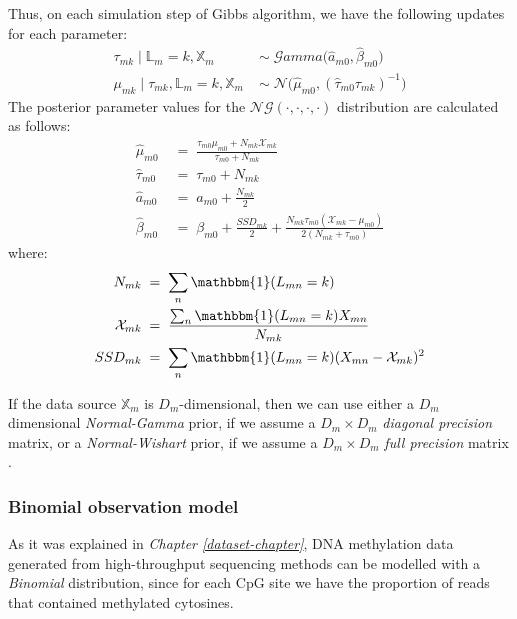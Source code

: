 Thus, on each simulation step of Gibbs algorithm, we have the following updates for each parameter:
\begin{equation}
  \begin{aligned}
  	\tau_{mk} \mid \mathbb{L}_{m}=k, \mathbb{X}_{m} \;& \sim \;\mathcal{G}amma\big(\hat{\mathit{a}}_{m0}, \hat{\beta}_{m0}\big) \\
	\mu_{mk} \mid \tau_{mk}, \mathbb{L}_{m}=k, \mathbb{X}_{m} \; & \sim \; \mathcal{N}\big(\hat{\mu}_{m0}, (\hat{\tau}_{m0} \tau_{mk})^{-1}\big)
  \end{aligned}
\end{equation}
The posterior parameter values for the $\mathcal{NG}(\cdot,\cdot,\cdot,\cdot)$ distribution are calculated as follows:
\begin{equation}
  \begin{aligned}
  	\hat{\mu}_{m0} \; &= \; \frac{\tau_{m0}\mu_{m0} + N_{mk}\mathcal{X}_{mk}}{\tau_{m0} + N_{mk}}\\
  	\hat{\tau}_{m0} \; &= \; \tau_{m0} + N_{mk}\\
  	\hat{\mathit{a}}_{m0} \; &= \; \mathit{a}_{m0} + \frac{N_{mk}}{2}\\
  	\hat{\beta}_{m0} \; &= \; \beta_{m0} + \frac{SSD_{mk}}{2} + \frac{N_{mk}\tau_{m0}(\mathcal{X}_{mk} - \mu_{m0})}{2(N_{mk}+\tau_{m0})}
  \end{aligned}
\end{equation}
where: 
\begin{equation}
  \begin{aligned}
		N_{mk} \; &= \; \sum_{n}\mathbbm{1}(L_{mn}=k)\\ 
		\mathcal{X}_{mk} \; &= \; \frac{\sum_{n}\mathbbm{1}(L_{mn}=k)X_{mn}}{N_{mk}} \\
		SSD_{mk} \; &= \; \sum_{n}\mathbbm{1}(L_{mn}=k)(X_{mn}-\mathcal{X}_{mk})^{2}
  \end{aligned}
\end{equation} 

If the data source $\mathbb{X}_{m}$ is $D_{m}$-dimensional, then we can use either a $D_{m}$ dimensional \emph{Normal-Gamma} prior, if we assume a $D_{m} \times D_{m}$ \emph{diagonal precision} matrix, or a \emph{Normal-Wishart} prior, if we assume a $D_{m} \times D_{m}$ \emph{full precision} matrix \cite[Ch. 2]{Bishop2006}.

\subsubsection*{Binomial observation model}
As it was explained in \emph{Chapter \ref{dataset-chapter}}, DNA methylation data generated from high-throughput sequencing methods can be modelled with a \emph{Binomial} distribution, since for each CpG site we have the proportion of reads that contained methylated cytosines.

